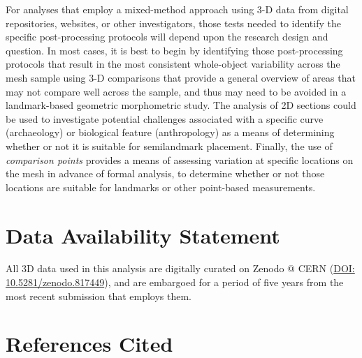 \documentclass[review]{elsarticle}
\begin{document}
For analyses that employ a mixed-method approach using 3-D data from digital repositories, websites, or other investigators, those tests needed to identify the specific post-processing protocols will depend upon the research design and question. In most cases, it is best to begin by identifying those post-processing protocols that result in the most consistent whole-object variability across the mesh sample using 3-D comparisons that provide a general overview of areas that may not compare well across the sample, and thus may need to be avoided in a landmark-based geometric morphometric study. The analysis of 2D sections could be used to investigate potential challenges associated with a specific curve (archaeology) or biological feature (anthropology) as a means of determining whether or not it is suitable for semilandmark placement. Finally, the use of \textit{comparison points} provides a means of assessing variation at specific locations on the mesh in advance of formal analysis, to determine whether or not those locations are suitable for landmarks or other point-based measurements.

\section*{Data Availability Statement}

All 3D data used in this analysis are digitally curated on Zenodo @ CERN (\href{https://zenodo.org/record/817449}{DOI: 10.5281/zenodo.817449}), and are embargoed for a period of five years from the most recent submission that employs them.

\section*{References Cited}


\end{document}
